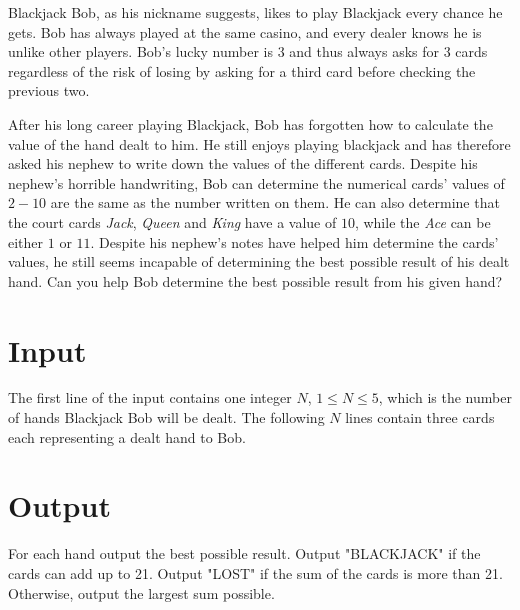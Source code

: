 Blackjack Bob, as his nickname suggests, likes to play Blackjack every chance he gets.
Bob has always played at the same casino, and every dealer knows he is unlike other players.
Bob's lucky number is $3$ and thus always asks for $3$ cards regardless of the risk of losing by asking for a third card before checking the previous two.

After his long career playing Blackjack, Bob has forgotten how to calculate the value of the hand dealt to him.
He still enjoys playing blackjack and has therefore asked his nephew to write down the values of the different cards.
Despite his nephew's horrible handwriting, Bob can determine the numerical cards' values of $2-10$ are the same as the number written on them.
He can also determine that the court cards \textit{Jack}, \textit{Queen} and \textit{King} have a value of $10$, while the \textit{Ace} can be either $1$ or $11$.
Despite his nephew's notes have helped him determine the cards' values, he still seems incapable of determining the best possible result of his dealt hand.
Can you help Bob determine the best possible result from his given hand?

\section*{Input}

The first line of the input contains one integer $N$, $1 \leq N \leq 5$, which is the number of hands Blackjack Bob will be dealt.
The following $N$ lines contain three cards each representing a dealt hand to Bob.


\section*{Output}

For each hand output the best possible result.
Output "BLACKJACK" if the cards can add up to 21.
Output "LOST" if the sum of the cards is more than 21.
Otherwise, output the largest sum possible.


